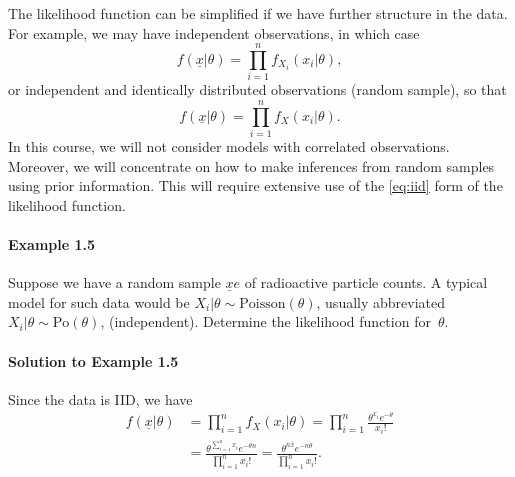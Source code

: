 The likelihood function can be simplified if we have further structure in the data. For example, we may have independent observations, in which case
\begin{equation}
\label{eq:indep}
f(\underline{x}|\theta)=\prod_{i=1}^n f_{X_i}(x_i|\theta),
\end{equation}
or independent and identically distributed observations (random sample), so that
\begin{equation}
\label{eq:iid}
f(\underline{x}|\theta)=\prod_{i=1}^n f_{X}(x_i|\theta).
\end{equation}
In this course, we will not consider models with correlated observations. Moreover, we will concentrate on how to make inferences from random samples using prior information. This will require extensive use of the \eqref{eq:iid} form of the likelihood function.

\clearpage

\paragraph{Example 1.5}{Suppose we have a random sample $\underline{x}e$ of radioactive particle counts. A typical model for such data would be $X_i|\theta\sim \text{Poisson}(\theta)$, usually abbreviated $X_{i}|\theta\sim\text{Po}(\theta)$, (independent). Determine the likelihood function for~$\theta$.

\paragraph{Solution to Example 1.5}{
    
        Since the data is IID, we have
        \begin{align*}
            f(\underline{x}|\theta) &= \prod_{i=1}^n f_{X}(x_i|\theta) = \prod_{i=1}^n \frac{\theta^{x_i} e^{-\theta}}{x_i!} \\
            &= \frac{\theta^{\sum_{i=1}^n x_i} e^{-\theta n}}{\prod_{i=1}^n x_i!} = \frac{\theta^{n\bar{x}} e^{-n\theta}}{\prod_{i=1}^n x_i!}.
        \end{align*}
    
}

\label{ex:poissonex}}

